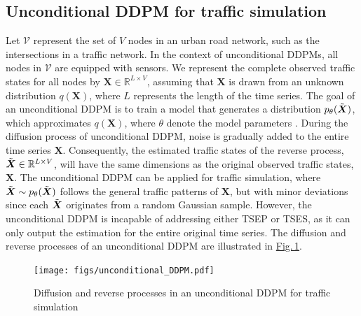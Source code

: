 \documentclass[a4paper,fleqn,12pt]{cas-sc}
\begin{document}
\subsection{Unconditional DDPM for traffic simulation}
Let $\boldsymbol{\mathcal{V}}$ represent the set of $V$ nodes in an urban road network, such as the intersections in a traffic network. In the context of unconditional DDPMs, all nodes in $\boldsymbol{\mathcal{V}}$ are equipped with sensors. We represent the complete observed traffic states for all nodes by $\boldsymbol{X}\in\mathbb{R}^{L\times V}$, assuming that $\boldsymbol{X}$ is drawn from an unknown distribution $q(\boldsymbol{X})$, where $L$ represents the length of the time series. The goal of an unconditional DDPM is to train a model that generates a distribution $p_{\theta}(\Tilde{\boldsymbol{X}})$, which approximates $q(\boldsymbol{X})$, where $\theta$ denote the model parameters \citep{song2020improved}. During the diffusion process of unconditional DDPM, noise is gradually added to the entire time series $\boldsymbol{X}$. Consequently, the estimated traffic states of the reverse process, $\Tilde{\boldsymbol{X}}\in\mathbb{R}^{L\times V}$, will have the same dimensions as the original observed traffic states, $\boldsymbol{X}$. The unconditional DDPM can be applied for traffic simulation, where $\Tilde{\boldsymbol{X}}\sim p_{\theta}(\Tilde{\boldsymbol{X}})$ follows the general traffic patterns of $\boldsymbol{X}$, but with minor deviations since each $\Tilde{\boldsymbol{X}}$ originates from a random Gaussian sample. However, the unconditional DDPM is incapable of addressing either TSEP or TSES, as it can only output the estimation for the entire original time series. The diffusion and reverse processes of an unconditional DDPM are illustrated in \hyperref[fig:unconditional_DDPM]{Fig.\,\ref{fig:unconditional_DDPM}}.

\begin{figure}[pos=htbp,width=14cm,align=\centering]
  \centering 
  \texttt{[image: figs/unconditional\_DDPM.pdf]}
  \caption{Diffusion and reverse processes in an unconditional DDPM for traffic simulation}\label{fig:unconditional_DDPM}
\end{figure}
\end{document}
